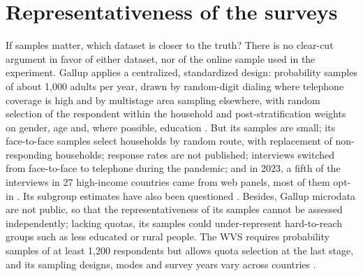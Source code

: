 \documentclass[11pt]{article}
\begin{document}
\section{Representativeness of the surveys}\label{subsec:data_quality}
If samples matter, which dataset is closer to the truth? There is no clear-cut argument in favor of either dataset, nor of the online sample used in the experiment. Gallup applies a centralized, standardized design: probability samples of about 1,000 adults per year, drawn by random-digit dialing where telephone coverage is high and by multistage area sampling elsewhere, with random selection of the respondent within the household and post-stratification weights on gender, age and, where possible, education \citep{gallup_methodology_2023}. But its samples are small; its face-to-face samples select households by random route, with replacement of non-responding households; response rates are not published; interviews switched from face-to-face to telephone during the pandemic; and in 2023, a fifth of the interviews in 27 high-income countries came from web panels, most of them opt-in \citep{gallup_methodology_2023}. Its subgroup estimates have also been questioned \citep{blanchflower_gallup_2024}. Besides, Gallup microdata are not public, so that the representativeness of its samples cannot be assessed independently; lacking quotas, its samples could under-represent hard-to-reach groups such as less educated or rural people. The WVS requires probability samples of at least 1,200 respondents but allows quota selection at the last stage, and its sampling designs, modes and survey years vary across countries \citep{wvs_rules_wave8}. %
\end{document}
